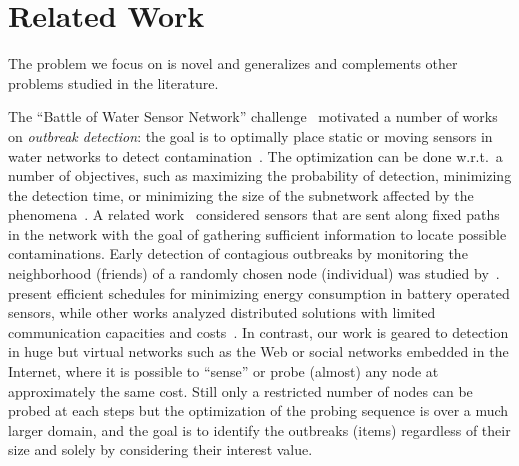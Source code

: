 \section{Related Work}\label{sec:related_work}
The problem we focus on is novel and generalizes and complements other problems
studied in the literature.

The  ``Battle of Water Sensor Network'' challenge~\citep{BWSN2008} motivated a
number of works on \emph{outbreak detection}: the goal is to optimally place
static or moving sensors in water networks to detect
contamination~\citep{Leskovec2007,Krause2008,Hart2010}. The optimization can be
done w.r.t.~a number of objectives, such as maximizing the probability of
detection, minimizing the detection time, or minimizing the size of the
subnetwork affected by the phenomena~\citep{Leskovec2007}. A related
work~\citep{AgumbeSuresh2012} considered sensors that are sent along fixed paths
in the network with the goal of gathering sufficient information to locate
possible contaminations. Early detection of contagious outbreaks by monitoring
the neighborhood (friends) of a randomly chosen node (individual) was studied
by~\citet{Christakis2010}.  \citet{Krause2009} present efficient schedules for
minimizing energy consumption in battery operated sensors, while other works
analyzed distributed solutions with limited communication capacities and
costs~\citep{Krause2011Kleinberg,Golovin2010,Krause2011}. %
In contrast, our work is geared to detection in huge but virtual networks such
as the Web or social networks embedded in the Internet, where it is possible to
``sense'' or probe (almost) any node at approximately the same cost. Still only
a restricted number of nodes can be probed at each steps but the optimization of
the probing sequence is over a much larger domain, and the goal is to identify
the outbreaks (items) regardless of their size and solely by considering their
interest value.

